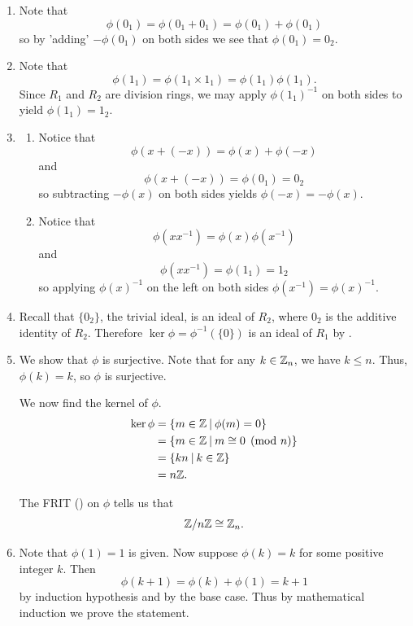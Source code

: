 \begin{enumerate}
    \item Note that
    \[
        \phi(0_1) = \phi(0_1 + 0_1) = \phi(0_1) + \phi(0_1)
    \]
    so by 'adding' $-\phi(0_1)$ on both sides we see that $\phi(0_1) = 0_2$.

    \item Note that
    \[
        \phi(1_1) = \phi(1_1 \times 1_1) = \phi(1_1)\phi(1_1).
    \]
    Since $R_1$ and $R_2$ are division rings, we may apply $\phi(1_1)^{-1}$ on both sides to yield $\phi(1_1) = 1_2$.

    \item \begin{enumerate}[label=(\alph*)]
        \item Notice that
        \[
            \phi(x + (-x)) = \phi(x) + \phi(-x)
        \]
        and
        \[
            \phi(x + (-x)) = \phi(0_1) = 0_2
        \]
        so subtracting $-\phi(x)$ on both sides yields $\phi(-x) = -\phi(x)$.

        \item Notice that
        \[
            \phi(xx^{-1}) = \phi(x)\phi(x^{-1})
        \]
        and
        \[
            \phi(xx^{-1}) = \phi(1_1) = 1_2
        \]
        so applying $\phi(x)^{-1}$ on the left on both sides $\phi(x^{-1}) = \phi(x)^{-1}$.
    \end{enumerate}

    \item Recall that $\{0_2\}$, the trivial ideal, is an ideal of $R_2$, where $0_2$ is the additive identity of $R_2$. Therefore $\ker\phi = \phi^{-1}(\{0\})$ is an ideal of $R_1$ by .

    \item We show that $\phi$ is surjective. Note that for any $k \in \mathbb{Z}_n$, we have $k \leq n$. Thus, $\phi(k) = k$, so $\phi$ is surjective.
    
    We now find the kernel of $\phi$.
    \begin{align*}
        \ker\phi &= \{m \in \Z \vert \phi(m) = 0\}\\
        &= \{m \in \Z \vert m \cong 0 \pmod n\}\\
        &= \{kn \vert k \in \Z\}\\
        &= n\Z.
    \end{align*}

    The FRIT () on $\phi$ tells us that
    \[
        \mathbb{Z}/n\mathbb{Z} \cong \mathbb{Z}_n.
    \]

    \item Note that $\phi(1) = 1$ is given. Now suppose $\phi(k) = k$ for some positive integer $k$. Then
    \[
        \phi(k+1) = \phi(k) + \phi(1) = k + 1
    \]
    by induction hypothesis and by the base case. Thus by mathematical induction we prove the statement.


\end{enumerate}
